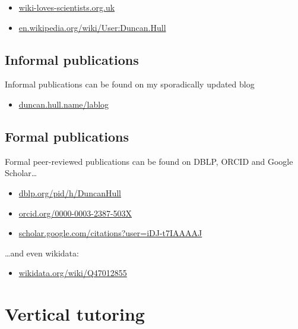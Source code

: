 \documentclass[12pt,]{book}
\providecommand{\tightlist}{%
  \setlength{\itemsep}{0pt}\setlength{\parskip}{0pt}}
\begin{document}
\begin{itemize}
\tightlist
\item
  \href{https://wiki-loves-scientists.org.uk/}{wiki-loves-scientists.org.uk}
\item
  \href{https://en.wikipedia.org/wiki/User:Duncan.Hull}{en.wikipedia.org/wiki/User:Duncan.Hull}
\end{itemize}

\hypertarget{informal-publications}{%
\section{Informal publications}\label{informal-publications}}

Informal publications can be found on my sporadically updated blog

\begin{itemize}
\tightlist
\item
  \href{https://duncan.hull.name/lablog/}{duncan.hull.name/lablog}
\end{itemize}

\hypertarget{formal-publications}{%
\section{Formal publications}\label{formal-publications}}

Formal peer-reviewed publications can be found on DBLP, ORCID and Google Scholar\ldots{}

\begin{itemize}
\tightlist
\item
  \href{https://dblp.org/pid/h/DuncanHull}{dblp.org/pid/h/DuncanHull}
\item
  \href{https://orcid.org/0000-0003-2387-503X}{orcid.org/0000-0003-2387-503X}
\item
  \href{https://scholar.google.com/citations?user=iDJ-t7IAAAAJ}{scholar.google.com/citations?user=iDJ-t7IAAAAJ}
\end{itemize}

\ldots{}and even wikidata:

\begin{itemize}
\tightlist
\item
  \href{https://www.wikidata.org/wiki/Q47012855}{wikidata.org/wiki/Q47012855}
\end{itemize}

\hypertarget{vertical-tutoring-1}{%
\chapter{Vertical tutoring}\label{vertical-tutoring-1}}
\end{document}
